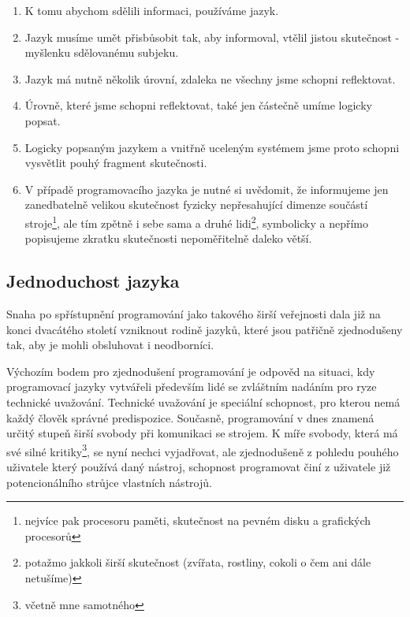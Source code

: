 \documentclass[11pt]{article}
\begin{document}
\begin{enumerate}
\item
K tomu abychom sdělili informaci, používáme jazyk.


\item
Jazyk musíme umět přisbůsobit tak, aby informoval, vtělil jistou skutečnost - myšlenku sdělovanému subjeku.

\item
Jazyk má nutně několik úrovní, zdaleka ne všechny jsme schopni reflektovat.

\item
Úrovně, které jsme schopni reflektovat, také jen částečně umíme logicky popsat.

\item
Logicky popsaným jazykem a vnitřně uceleným systémem jsme proto schopni vysvětlit pouhý fragment skutečnosti.

\item
V případě programovacího jazyka je nutné si uvědomit, že informujeme jen zanedbatelně velikou skutečnost fyzicky nepřesahující dimenze součástí stroje\footnote{nejvíce pak procesoru paměti, skutečnost na pevném disku a grafických procesorů}, ale tím zpětně i sebe sama a druhé lidi\footnote{potažmo jakkoli širší skutečnost (zvířata, rostliny, cokoli o čem ani dále netušíme)}, symbolicky a nepřímo popisujeme zkratku skutečnosti nepoměřitelně daleko větší.
\end{enumerate}


\subsection{Jednoduchost jazyka}

Snaha po spřístupnění programování jako takového širší veřejnosti dala již na konci dvacátého století vzniknout rodině jazyků, které jsou patřičně zjednodušeny tak, aby je mohli obsluhovat i neodborníci.

Výchozím bodem pro zjednodušení programování je odpověd na situaci, kdy programovací jazyky vytvářeli především lidé se zvláštním nadáním pro ryze technické uvažování. Technické uvažování je speciální schopnost, pro kterou nemá každý člověk správné predispozice. Současně, programování v dnes znamená určitý stupeň širší svobody při komunikaci se strojem. K míře svobody, která má své silné kritiky\footnote{včetně mne samotného}, se nyní nechci vyjadřovat, ale zjednodušeně z pohledu pouhého uživatele který používá daný nástroj, schopnost programovat činí z uživatele již potencionálního strůjce vlastních nástrojů.
\end{document}
